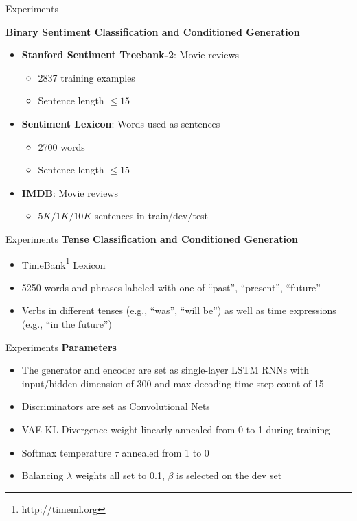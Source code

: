 \documentclass{beamer}
\begin{document}
\begin{frame}{Experiments}

	\textbf{Binary Sentiment Classification and Conditioned Generation}

	\begin{itemize}
		\item \textbf{Stanford Sentiment Treebank-2}: Movie reviews
		      \begin{itemize}
			      \item 2837 training examples
			      \item Sentence length $\leq 15$
		      \end{itemize}
		\item \textbf{Sentiment Lexicon}: Words used as sentences
		      \begin{itemize}
			      \item 2700 words
			      \item Sentence length $\leq 15$
		      \end{itemize}
		\item \textbf{IMDB}: Movie reviews
		      \begin{itemize}
			      \item $5K/1K/10K$ sentences in train/dev/test
		      \end{itemize}
	\end{itemize}
\end{frame}

\begin{frame}{Experiments}
	\textbf{Tense Classification and Conditioned Generation}
	\begin{itemize}
		\item TimeBank\footnote{http://timeml.org} Lexicon
		\item 5250 words and phrases labeled with one of {“past”, “present”, “future”}
		\item Verbs in different tenses (e.g., “was”, “will be”) as well as time expressions (e.g., “in the future”)
	\end{itemize}
\end{frame}

\begin{frame}{Experiments}
	\textbf{Parameters}
	\begin{itemize}
		\item The generator and encoder are set as single-layer LSTM RNNs with input/hidden dimension of 300 and max decoding time-step count of 15
		\item Discriminators are set as Convolutional Nets
		\item VAE KL-Divergence weight linearly annealed from 0 to 1 during training
		\item Softmax temperature $\tau$ annealed from 1 to 0
		\item Balancing $\lambda$ weights all set to 0.1, $\beta$ is selected on the dev set
	\end{itemize}
\end{frame}
\end{document}
